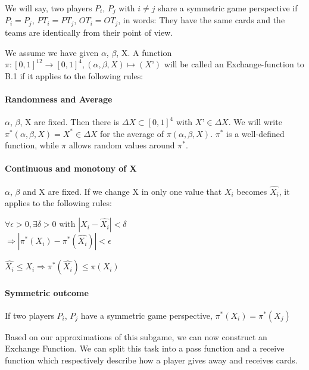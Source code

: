 \begin{definition}
We will say, two players $P_i$, $P_j$ with  $i \neq j$ share a symmetric game perspective if $P_i = P_j$, $PT_i = PT_j$, $OT_i = OT_j$, in words: They have the same cards and the teams are identically from their point of view. 
\end{definition}
\begin{definition}
We assume we have given $\alpha$, $\beta$, X. A function $\pi: [0,1]^{12} \to [0,1]^4, (\alpha, \beta, X) \mapsto (X’)$ will be called an Exchange-function to B.1  if it applies to the following rules:
\paragraph{Randomness and Average}
$\alpha$, $\beta$, X are fixed. Then there is $\Delta X \subset [0,1]^4$ with $X’ \in \Delta X$. We will write $\pi^* (\alpha, \beta, X) = X^* \in \Delta X$ for the average of $\pi(\alpha, \beta, X)$. $\pi^*$ is a well-defined function, while $\pi$ allows random values around $\pi^*$.
\paragraph{Continuous and monotony of X}
$\alpha$, $\beta$ and X are fixed. If we change X in only one value that $X_i$ becomes $\widehat{X_i}$, it applies to the following rules:
\begin{axioms}[(C1)]
\item $\forall \epsilon > 0, \exists \delta > 0$ with $| X_i - \widehat{X_i}| < \delta$ \\$\Rightarrow | \pi^*(X_i) - \pi^*(\widehat{X_i}) | < \epsilon $
\item $\widehat{X_i} \leq X_i \Rightarrow \pi^*(\widehat{X_i}) \leq \pi(X_i)$
\end{axioms}

\paragraph{Symmetric outcome}
If two players $P_i$, $P_j$ have a symmetric game perspective, $\pi^*(X_i) = \pi^*(X_j)$
\end{definition}

Based on our approximations of this subgame, we can now construct an Exchange Function. We can split this task into a pass function and a receive function which respectively describe how a player gives away and receives cards.

